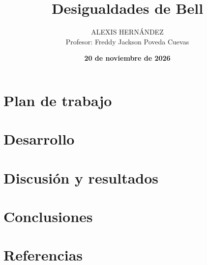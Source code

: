 \documentclass[10pt]{beamer}
\title[Introducción a la Física Atómica y Molecular] %
{ %
      \textbf{Desigualdades de Bell}
}
\author[\textbf{Alexis Hernández}]
{      ALEXIS HERNÁNDEZ\\
      {\ttfamily Profesor: Freddy Jackson Poveda Cuevas}
}
\institute[]
{
    \textbf{Facultad de Ciencias, UNAM\\
      Introducción a la Física Atómica y Molecular \\
      Semestre 2027-1 \\ }
  
}
\date{\textbf{20 de noviembre de 2026}}
\begin{document}
{\1
\begin{frame}
	\titlepage
\end{frame}}

{\1
\section{Plan de trabajo}\label{sec:plan_trabajo}


\section{Desarrollo}\label{sec:desarrollo}


\section{Discusión y resultados}\label{sec:discusion}


\section{Conclusiones}\label{sec:conclusiones}


\section{Referencias}

}

{\1
\begin{frame}
\end{frame}}
	
\end{document}
